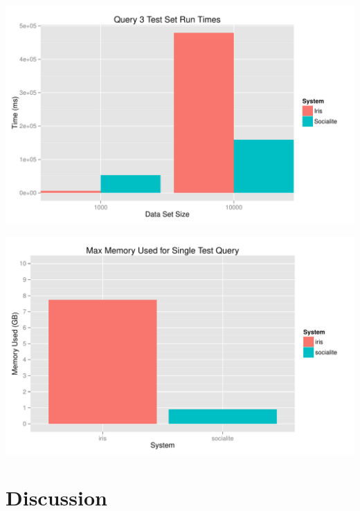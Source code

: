 \documentclass{article}
\begin{document}
\begin{multicols}{2}
\begingroup
    \centering
    \includegraphics[scale=0.4]{../results/query3.pdf}
    \label{fig:q3}
\endgroup

\begingroup
    \centering
    \includegraphics[scale=0.4]{../results/memory.pdf}
    \label{fig:memory}
\endgroup
\section{Discussion}





\end{multicols}
\end{document}

